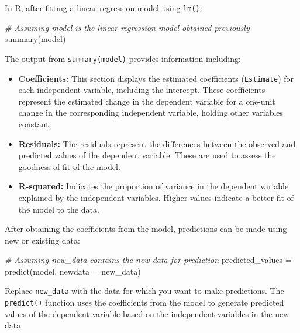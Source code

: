 \documentclass[
]{article}
\newenvironment{Shaded}{}{}
\newcommand{\AttributeTok}[1]{\textcolor[rgb]{0.49,0.56,0.16}{#1}}
\newcommand{\CommentTok}[1]{\textcolor[rgb]{0.38,0.63,0.69}{\textit{#1}}}
\newcommand{\FunctionTok}[1]{\textcolor[rgb]{0.02,0.16,0.49}{#1}}
\newcommand{\NormalTok}[1]{#1}
\newcommand{\OtherTok}[1]{\textcolor[rgb]{0.00,0.44,0.13}{#1}}
\begin{document}
In R, after fitting a linear regression model using \texttt{lm()}:

\begin{Shaded}
\begin{Highlighting}[]
\CommentTok{\# Assuming \textquotesingle{}model\textquotesingle{} is the linear regression model obtained previously}
\FunctionTok{summary}\NormalTok{(model)}
\end{Highlighting}
\end{Shaded}

The output from \texttt{summary(model)} provides information including:

\begin{itemize}
\item
  \textbf{Coefficients:} This section displays the estimated
  coefficients (\texttt{Estimate}) for each independent variable,
  including the intercept. These coefficients represent the estimated
  change in the dependent variable for a one-unit change in the
  corresponding independent variable, holding other variables constant.
\item
  \textbf{Residuals:} The residuals represent the differences between
  the observed and predicted values of the dependent variable. These are
  used to assess the goodness of fit of the model.
\item
  \textbf{R-squared:} Indicates the proportion of variance in the
  dependent variable explained by the independent variables. Higher
  values indicate a better fit of the model to the data.
\end{itemize}

After obtaining the coefficients from the model, predictions can be made
using new or existing data:

\begin{Shaded}
\begin{Highlighting}[]
\CommentTok{\# Assuming \textquotesingle{}new\_data\textquotesingle{} contains the new data for prediction}
\NormalTok{predicted\_values }\OtherTok{=} \FunctionTok{predict}\NormalTok{(model, }\AttributeTok{newdata =}\NormalTok{ new\_data)}
\end{Highlighting}
\end{Shaded}

Replace \texttt{new\_data} with the data for which you want to make
predictions. The \texttt{predict()} function uses the coefficients from
the model to generate predicted values of the dependent variable based
on the independent variables in the new data.
\end{document}
